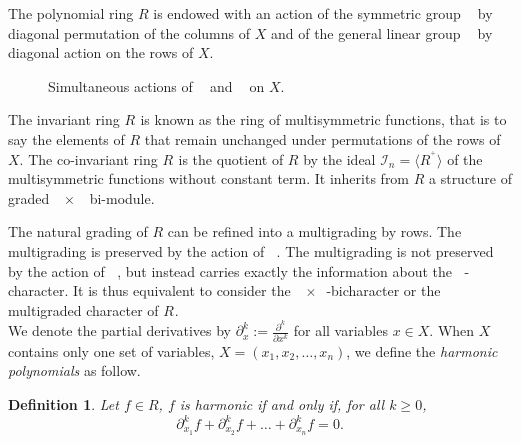 \documentclass[letter,12pt]{article}
\newcommand{\pauline}[1]{\todo[linecolor=blue,backgroundcolor=cyan!25,bordercolor=blue]{#1}}
\DeclareMathOperator{\Sn}{\mathbb{S}_n}
\DeclareMathOperator{\GLr}{GL_r}
\newtheorem{definition}{Definition}
\begin{document}
	The polynomial ring $R$ is endowed with an action of the symmetric group $\Sn$ by diagonal permutation of the columns of $X$ and of the general linear group $\GLr$ by diagonal action on the rows of $X$. 
	\begin{figure}[H]
		\centering
		\caption{Simultaneous actions of $\GLr$ and $\Sn$ on $X$.}
	\end{figure}
	
	The invariant ring $R^{\Sn}$ is known as the ring of multisymmetric functions, that is to say the elements of $R$ that remain unchanged under permutations of the rows of $X$. The co-invariant ring $R_{\Sn}$ is the quotient of $R$ by the ideal $\mathcal{I}_n = \langle {R^{\Sn^+}} \rangle$ of the multisymmetric functions without constant term. It inherits from $R$ a structure of graded $\GLr \times \Sn$ bi-module. \pauline{Add details about grading.}
	
	The natural grading of $R$ can be refined into a multigrading by rows. The multigrading is preserved by the action of $\Sn$. The multigrading is not preserved by the action of $\GLr$, but instead carries exactly the information about the $\GLr$-character. It is thus equivalent to consider the $\GLr \times \Sn$-bicharacter or the $\Sn$ multigraded character of $R_{\Sn}$. \\
	
	
	We denote the partial derivatives by $\partial^k_x := \frac{\partial^k}{\partial x^k}$ for all variables $x \in X$.
	When $X$ contains only one set of variables, $X = (x_1, x_2, \dots, x_n)$, we define the \emph{harmonic polynomials} as follow.
	
	\begin{definition}
		Let $f \in R$, $f$ is \emph{harmonic} if and only if, for all $k \geq 0$,
		$$\partial^k_{x_1} f + \partial^k_{x_2} f + \dots + \partial^k_{x_n} f = 0.$$
	\end{definition}
\end{document}
